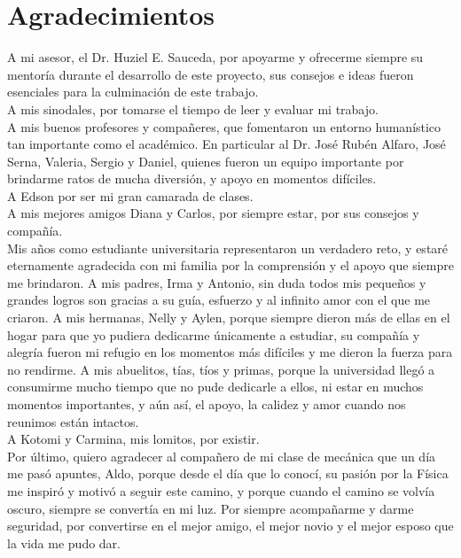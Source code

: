 
\bigskip

\begingroup
\let\clearpage\relax
\let\cleardoublepage\relax
\let\cleardoublepage\relax
\chapter*{Agradecimientos}

A mi asesor, el Dr. Huziel E. Sauceda, por apoyarme y ofrecerme siempre su mentoría durante el desarrollo de este proyecto, sus consejos e ideas fueron esenciales para la culminación de este trabajo.
\\
A mis sinodales, por tomarse el tiempo de leer y evaluar mi trabajo.
\\

A mis buenos profesores y compañeres, que fomentaron un entorno humanístico tan importante como el académico. En particular al Dr. José Rubén Alfaro, José Serna, Valeria, Sergio y Daniel, quienes fueron un equipo importante por brindarme ratos de mucha diversión, y apoyo en momentos difíciles.\\
A Edson por ser mi gran camarada de clases.
\\
A mis mejores amigos Diana y Carlos, por siempre estar, por sus consejos y compañía.
\\

Mis años como estudiante universitaria representaron un verdadero reto, y estaré eternamente agradecida con mi familia por la comprensión y el apoyo que siempre me brindaron. A mis padres, Irma y Antonio, sin duda todos mis pequeños y grandes logros son gracias a su guía, esfuerzo y al infinito amor con el que me criaron. A mis hermanas, Nelly y Aylen, porque siempre dieron más de ellas en el hogar para que yo pudiera dedicarme únicamente a estudiar, su compañía y alegría fueron mi refugio en los momentos más difíciles y me dieron la fuerza para no rendirme. A mis abuelitos, tías, tíos y primas, porque la universidad llegó a consumirme mucho tiempo que no pude dedicarle a ellos, ni estar en muchos momentos importantes, y aún así, el apoyo, la calidez y amor cuando nos reunimos están intactos.\\
A Kotomi y Carmina, mis lomitos, por existir.
\\
Por último, quiero agradecer al compañero de mi clase de mecánica que un día me pasó apuntes, Aldo, porque desde el día que lo conocí, su pasión por la Física me inspiró y motivó a seguir este camino, y porque cuando el camino se volvía oscuro, siempre se convertía en mi luz. Por siempre acompañarme y darme seguridad, por convertirse en el mejor amigo, el mejor novio y el mejor esposo que la vida me pudo dar.
\endgroup
